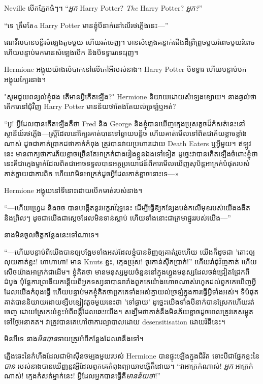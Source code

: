 Neville បើកភ្នែកធំៗ។ “\emph{អ្នក} Harry Potter? \emph{The} Harry Potter? \emph{អ្នក?}”

“ទេ ត្រឹមតែ\emph{a} Harry Potter មានខ្ញុំបីនាក់នៅលើរថភ្លើងនេះ—”

ណេវីល​បាន​បន្លឺ​សំឡេង​តូច​មួយ ហើយ​រត់​ចេញ។ មាន​សំឡេង​គន្លាក់​ជើង​ដ៏​ព្រឺព្រួច​មួយ​រំពេច​មួយ​រំពេច ហើយ​បន្ទាប់​មក​មាន​សំឡេង​បើក និង​បិទ​ទ្វារ​រទេះរុញ។

Hermione អង្គុយយ៉ាងលំបាកនៅលើកៅអីរបស់នាង។ Harry Potter បិទទ្វារ ហើយបន្ទាប់មកអង្គុយក្បែរនាង។

"សូមជួយពន្យល់ខ្ញុំផង តើមានអ្វីកើតឡើង?" Hermione និយាយដោយសំឡេងខ្សោយ។ នាង​ឆ្ងល់​ថា​តើ​ការ​នៅ​ជុំវិញ Harry Potter មាន​ន័យ​ថា​តែងតែ​យល់​ច្រឡំ​ឬ​អត់?

“អូ! អ្វីដែលបានកើតឡើងគឺថា Fred និង George និងខ្ញុំបានឃើញក្មេងប្រុសតូចដ៏កំសត់នេះនៅស្ថានីយ៍រថភ្លើង—ស្ត្រីដែលនៅក្បែរគាត់បានទៅឆ្ងាយបន្តិច ហើយគាត់មើលទៅពិតជាភ័យខ្លាចខ្លាំងណាស់ ដូចជាគាត់ប្រាកដថាគាត់កំពុង ត្រូវបានវាយប្រហារដោយ Death Eaters ឬអ្វីមួយ។ ឥឡូវនេះ មានពាក្យថាការភ័យខ្លាចច្រើនតែអាក្រក់ជាងរឿងខ្លួនឯងទៅទៀត ដូច្នេះវាបានកើតឡើងចំពោះខ្ញុំថា នេះគឺជាក្មេងម្នាក់ដែលពិតជាអាចទទួលបានអត្ថប្រយោជន៍ពីការមើលឃើញសុបិន្តអាក្រក់បំផុតរបស់គាត់ក្លាយជាការពិត ហើយវាមិនអាក្រក់ដូចអ្វីដែលគាត់ខ្លាចនោះទេ—»

Hermione អង្គុយនៅទីនោះដោយបើកមាត់របស់នាង។

“—ហើយហ្វ្រេដ និងចច បានបង្កើតនូវអក្ខរាវិរុទ្ធនេះ ដើម្បីធ្វើឱ្យកន្សែងបង់កលើមុខរបស់យើងងងឹត និងព្រិលៗ ដូចជាយើងជាស្តេចដែលមិនទាន់ស្លាប់ ហើយទាំងនោះជាក្រមាផ្នូររបស់យើង—”

នាងមិនចូលចិត្តកន្លែងនេះទៅណាទេ។

“—ហើយ​បន្ទាប់​ពី​យើង​បាន​ឲ្យ​បង្អែម​ទាំង​អស់​ដែល​ខ្ញុំ​បាន​ទិញ​ឲ្យ​គាត់​រួច​ហើយ យើង​ក៏​ដូច​ជា 'តោះ​ឲ្យ​លុយ​គាត់​ខ្លះ! ហាហាហា! មាន Knuts ខ្លះ, ក្មេងប្រុស! ចូរ​កាន់​ស៊ីក​ប្រាក់!” ហើយ​រាំ​ជុំវិញ​គាត់ ហើយ​សើច​យ៉ាង​អាក្រក់​ជាដើម។ ខ្ញុំគិតថា មានមនុស្សមួយចំនួននៅក្នុងហ្វូងមនុស្សដែលចង់ជ្រៀតជ្រែកពីដំបូង ប៉ុន្តែការព្រងើយកន្តើយពីអ្នកទស្សនាបានរារាំងពួកគេយ៉ាងហោចណាស់រហូតដល់ពួកគេឃើញអ្វីដែលយើងកំពុងធ្វើ ហើយបន្ទាប់មកខ្ញុំគិតថាពួកគេទាំងអស់គ្នាយល់ច្រឡំក្នុងការធ្វើអ្វីទាំងអស់។ ទីបំផុតគាត់បាននិយាយដោយខ្សឹបខ្សៀវតូចមួយនេះថា 'ទៅឆ្ងាយ' ដូច្នេះយើងទាំងបីនាក់បានស្រែកហើយរត់ចេញ ដោយស្រែកយំខ្លះអំពីពន្លឺដែលឆេះយើង។ សង្ឃឹម​ថា​គាត់​នឹង​មិន​ភ័យ​ខ្លាច​ដូច​ពេល​ត្រូវ​គេ​សម្លុត​ទៅ​ថ្ងៃ​អនាគត។ វាត្រូវបានគេហៅថាការព្យាបាលដោយ desensitisation ដោយវិធីនេះ។

មិនអីទេ នាង\emph{មិនបាន}ទាយត្រូវអំពីកន្លែងដែលវានឹងទៅ។

ភ្លើងឆេះនៃកំហឹងដែលជាម៉ាស៊ីនចម្បងមួយរបស់ Hermione បានផ្ទុះឡើងក្នុងជីវិត ទោះបីជាផ្នែកខ្លះនៃ\emph{បាន} របស់នាងបានឃើញនូវអ្វីដែលពួកគេកំពុងព្យាយាមធ្វើក៏ដោយ។ “វាអាក្រក់ណាស់! \emph{អ្នក} អាក្រក់ណាស់! ក្មេងកំសត់ម្នាក់នេះ! អ្វីដែលអ្នកបានធ្វើគឺ\emph{មានន័យថា}!”

